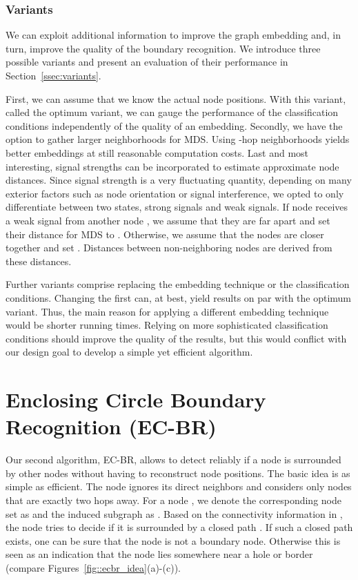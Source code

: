 \documentclass{llncs}
\begin{document}
\subsubsection{Variants}\label{ssec:mdsbr_variants}
We can exploit additional information to improve the graph embedding and, in turn, improve the quality of the boundary recognition.
We introduce three possible variants and present an evaluation of their performance in Section~\ref{ssec:variants}.

First, we can assume that we know the actual node positions.
With this variant, called the optimum variant, we can gauge the performance of the classification conditions independently of the quality of an embedding.
Secondly, we have the option to gather larger neighborhoods for MDS.
Using -hop neighborhoods yields better embeddings at still reasonable computation costs.
Last and most interesting, signal strengths can be incorporated to estimate approximate node distances.
Since signal strength is a very fluctuating quantity, depending on many exterior factors such as node orientation or signal interference, we opted to only differentiate between two states, strong signals and weak signals.
If node  receives a weak signal from another node , we assume that they are far apart and set their distance for MDS to .
Otherwise, we assume that the nodes are closer together and set .
Distances between non-neighboring nodes are derived from these distances.

Further variants comprise replacing the embedding technique or the classification conditions.
Changing the first can, at best, yield results on par with the optimum variant.
Thus, the main reason for applying a different embedding technique would be shorter running times.
Relying on more sophisticated classification conditions should improve the quality of the results, but this would conflict with our design goal to develop a simple yet efficient algorithm.


\section{Enclosing Circle Boundary Recognition (EC-BR)}\label{sec:ecbr}
Our second algorithm, EC-BR, allows to detect reliably if a node is surrounded by other nodes without having to reconstruct node positions.
The basic idea is as simple as efficient.
The node ignores its direct neighbors and considers only nodes that are exactly two hops away.
For a node , we denote the corresponding node set as  and the induced subgraph as .
Based on the connectivity information in  , the node tries to decide if it is surrounded by a closed path .
If such a closed path exists, one can be sure that the node is not a boundary node.
Otherwise this is seen as an indication that the node lies somewhere near a hole or border (compare Figures~\ref{fig::ecbr_idea}(a)-(c)).
\end{document}
